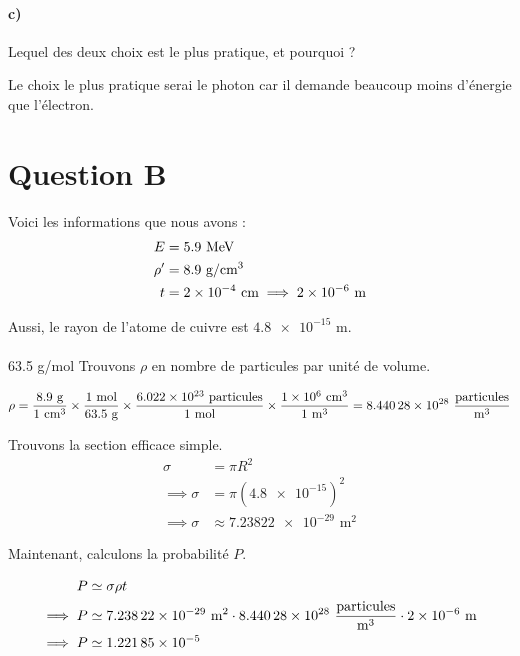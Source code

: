\documentclass[11pt, letterpaper]{article}
\begin{document}
\paragraph*{c)}
Lequel des deux choix est le plus pratique, et pourquoi ?
\begin{tcolorbox}[tommy]
Le choix le plus pratique serai le photon car il demande beaucoup moins d'énergie que l'électron.
\end{tcolorbox}

\vspace{1cm}

\section*{Question B}
Voici les informations que nous avons :
\begin{align*}
    E &= 5.9 \text{ MeV}  \\
    \rho'&=  8.9 \text{ g} / \text{cm}^3  \\
    t &=  \num{2e-4} \text{ cm}  \implies \num{2e -6} \text{ m} 
\end{align*}

Aussi, le rayon de l'atome de cuivre est $\num{4.8e-15}$ m. \\\\
63.5 g/mol
Trouvons $\rho$ en nombre de particules par unité de volume. 

\begin{align*}
    \rho = \frac{8.9 \text{ g} }{1 \text{ cm}^3 }  \times \frac{1 \text{ mol} }{63.5 \text{ g} } \times \frac{\num{6.022e 23} \text{ particules} }{1 \text{ mol} } \times \frac{\num{1e 6} \text{ cm}^3 }{1 \text{ m}^3 }   = \num{8.44028e 28} \ \frac{ \text{particules} }{ \text{m}^3 } 
\end{align*}


Trouvons la section efficace simple.
\begin{align*}
    \sigma &=  \pi R^2 \\
    \implies 
    \sigma &=  \pi \left(\num{4.8e-15}\right)^2\\
    \implies 
    \sigma &\approx \num{7.23822e-29} \text{ m}^2 
\end{align*}

Maintenant, calculons la probabilité $P$. 

\begin{align*}
    P &\simeq \sigma \rho t \\
    \implies 
    P &\simeq  \num{7.23822e-29} \text{ m}^2   \cdot 
    \num{8.44028e 28} \ \frac{ \text{particules} }{ \text{m}^3 } 
    \cdot 
    \num{2e-6} \text{ m} \\
    \implies 
    P &\simeq  \num{1.22185e-5} \\
\end{align*}
\end{document}
